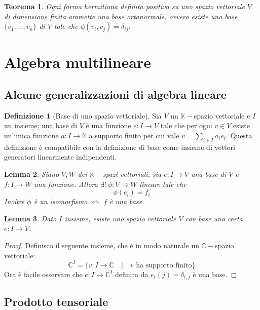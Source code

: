 \documentclass[11pt]{article}
\theoremstyle{plain}
\newtheorem{thm}{Teorema}[section]
\newtheorem{lemma}[thm]{Lemma}
\theoremstyle{definition}
\newtheorem{defn}{Definizione}[section]
\theoremstyle{remark}
\newcommand{\C}{\mathbb{C}}
\newcommand{\K}{\mathbb{K}}
\begin{document}
\begin{thm}
	Ogni forma hermitiana definita positiva su uno spazio vettoriale $V$ di dimensione finita ammette una \textit{base ortonormale}, ovvero esiste una base $\{v_1,\ldots,v_n\}$ di $V$ tale che $\phi(v_i,v_j)=\delta_{ij}$. 
\end{thm}




\newpage
\section{Algebra multilineare}
\subsection{Alcune generalizzazioni di algebra lineare}

\begin{defn}[Base di uno spazio vettoriale]
Sia $V$ un $\K-$spazio vettoriale e $I$ un insieme; una base di $V$ è una funzione $e: I \to V$ tale che 
per ogni $v \in V$ esiste un'unica funzione $a: I \to \K$ a supporto finito per cui vale $v=\sum_{i\in I}a_i e_i$.
Questa definizione è compatibile con la definizione di base come insieme di vettori generatori linearmente indipendenti.
\end{defn}


\begin{lemma}
Siano $V,W$ dei $\K-$spazi vettoriali, sia $e:I\to V$ una base di $V$ e $f: I \to W$ una funzione. Allora $\exists!\  \phi: V \to W$ lineare tale che
\[\phi(e_i) = f_i \]
Inoltre $\phi$ è un isomorfismo $\Leftrightarrow$ $f$ è una base.
\end{lemma}

\begin{lemma}
Dato $I$ insieme, esiste uno spazio vettoriale $V$ con base una certa $e:I\to V$.
\end{lemma}
\begin{proof}
Definisco il seguente insieme, che è in modo naturale un $\C-$spazio vettoriale:
\[ \C^I = \{ v:I\to\C \quad|\quad v \text{ ha supporto finito}\}\]
Ora è facile osservare che $e:I\to\C^I$ definita da $e_i(j) = \delta_{i,j}$ è una base.
\end{proof}


\subsection{Prodotto tensoriale}


  
\end{document}
